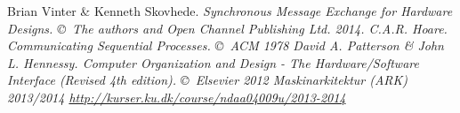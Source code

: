 \begin{thebibliography}{9}
     Brian Vinter \& Kenneth Skovhede. \it{Synchronous Message
        Exchange for Hardware Designs}. \copyright\ The authors and Open
        Channel Publishing Ltd. 2014.
     C.A.R. Hoare. \it{Communicating Sequential Processes}.
        \copyright\ ACM 1978
     David A. Patterson \& John L. Hennessy. \it{Computer
        Organization and Design - The Hardware/Software Interface (Revised 4th
        edition)}.  \copyright\ Elsevier 2012
     Maskinarkitektur (ARK) 2013/2014
        \url{http://kurser.ku.dk/course/ndaa04009u/2013-2014}
\end{thebibliography}

